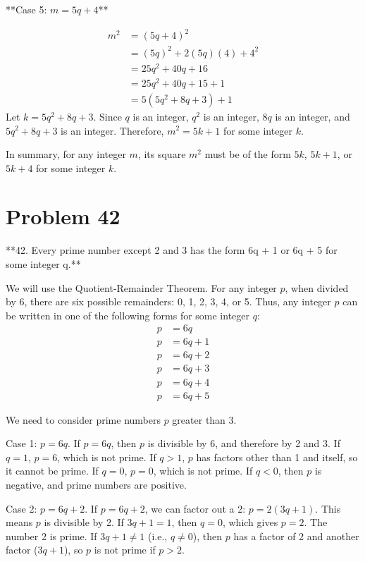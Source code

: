 \documentclass{article}
\begin{document}
**Case 5: $m = 5q + 4$**

\begin{align*} m^2 &= (5q + 4)^2 \\ &= (5q)^2 + 2(5q)(4) + 4^2 \\ &= 25q^2 + 40q + 16 \\ &= 25q^2 + 40q + 15 + 1 \\ &= 5(5q^2 + 8q + 3) + 1 \end{align*}
Let $k = 5q^2 + 8q + 3$. Since $q$ is an integer, $q^2$ is an integer, $8q$ is an integer, and $5q^2 + 8q + 3$ is an integer. Therefore, $m^2 = 5k + 1$ for some integer $k$.

In summary, for any integer $m$, its square $m^2$ must be of the form $5k$, $5k+1$, or $5k+4$ for some integer $k$.

\newpage

\section*{Problem 42}
**42. Every prime number except 2 and 3 has the form 6q + 1 or 6q + 5 for some integer q.**

We will use the Quotient-Remainder Theorem. For any integer $p$, when divided by 6, there are six possible remainders: 0, 1, 2, 3, 4, or 5. Thus, any integer $p$ can be written in one of the following forms for some integer $q$:
\begin{align*} p &= 6q \\ p &= 6q + 1 \\ p &= 6q + 2 \\ p &= 6q + 3 \\ p &= 6q + 4 \\ p &= 6q + 5 \end{align*}

We need to consider prime numbers $p$ greater than 3.

Case 1: $p = 6q$.
If $p = 6q$, then $p$ is divisible by 6, and therefore by 2 and 3. If $q=1$, $p=6$, which is not prime. If $q > 1$, $p$ has factors other than 1 and itself, so it cannot be prime. If $q=0$, $p=0$, which is not prime. If $q < 0$, then $p$ is negative, and prime numbers are positive.

Case 2: $p = 6q + 2$.
If $p = 6q + 2$, we can factor out a 2: $p = 2(3q + 1)$. This means $p$ is divisible by 2. If $3q+1 = 1$, then $q=0$, which gives $p=2$. The number 2 is prime. If $3q+1 \neq 1$ (i.e., $q \neq 0$), then $p$ has a factor of 2 and another factor ($3q+1$), so $p$ is not prime if $p > 2$.
\end{document}
